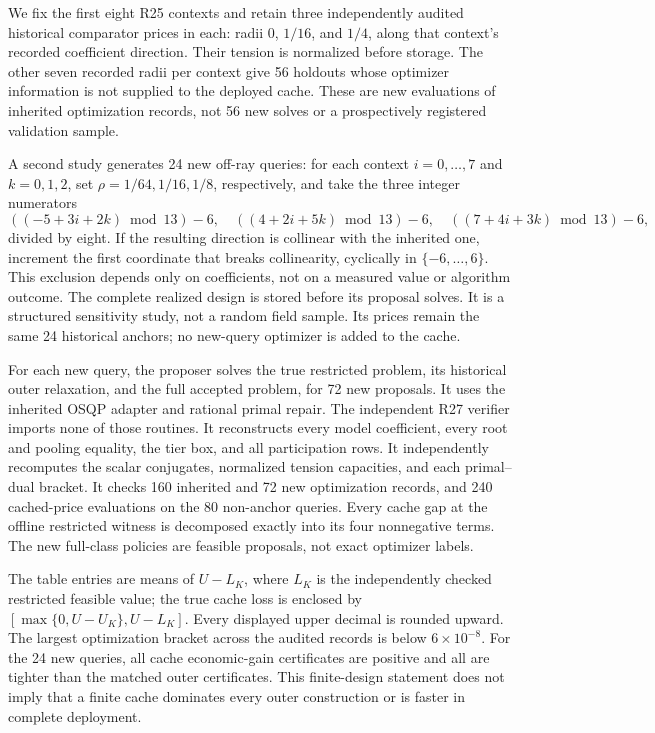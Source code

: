 We fix the first eight R25 contexts and retain three independently audited historical comparator prices in each: radii $0$, $1/16$, and $1/4$, along that context's recorded coefficient direction. Their tension is normalized before storage. The other seven recorded radii per context give 56 holdouts whose optimizer information is not supplied to the deployed cache. These are new evaluations of inherited optimization records, not 56 new solves or a prospectively registered validation sample.

A second study generates 24 new off-ray queries: for each context $i=0,\ldots,7$ and $k=0,1,2$, set $\rho=1/64,1/16,1/8$, respectively, and take the three integer numerators
\[
 ((-5+3i+2k)\bmod13)-6,\quad
 ((4+2i+5k)\bmod13)-6,\quad
 ((7+4i+3k)\bmod13)-6,
\]
divided by eight. If the resulting direction is collinear with the inherited one, increment the first coordinate that breaks collinearity, cyclically in $\{-6,\ldots,6\}$. This exclusion depends only on coefficients, not on a measured value or algorithm outcome. The complete realized design is stored before its proposal solves. It is a structured sensitivity study, not a random field sample. Its prices remain the same 24 historical anchors; no new-query optimizer is added to the cache.

For each new query, the proposer solves the true restricted problem, its historical outer relaxation, and the full accepted problem, for 72 new proposals. It uses the inherited OSQP adapter and rational primal repair. The independent R27 verifier imports none of those routines. It reconstructs every model coefficient, every root and pooling equality, the tier box, and all participation rows. It independently recomputes the scalar conjugates, normalized tension capacities, and each primal--dual bracket. It checks 160 inherited and 72 new optimization records, and 240 cached-price evaluations on the 80 non-anchor queries. Every cache gap at the offline restricted witness is decomposed exactly into its four nonnegative terms. The new full-class policies are feasible proposals, not exact optimizer labels.

The table entries are means of $U-L_K$, where $L_K$ is the independently checked restricted feasible value; the true cache loss is enclosed by $[\max\{0,U-U_K\},U-L_K]$. Every displayed upper decimal is rounded upward. The largest optimization bracket across the audited records is below $6\times10^{-8}$. For the 24 new queries, all cache economic-gain certificates are positive and all are tighter than the matched outer certificates. This finite-design statement does not imply that a finite cache dominates every outer construction or is faster in complete deployment.

